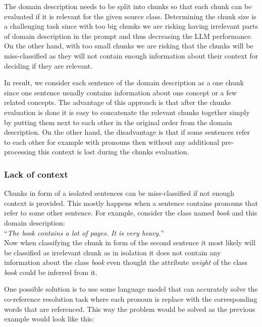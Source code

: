 The domain description needs to be split into chunks so that each chunk can be evaluated if it is relevant for the given source class. Determining the chunk size is a challenging task since with too big chunks we are risking having irrelevant parts of domain description in the prompt and thus decreasing the LLM performance. On the other hand, with too small chunks we are risking that the chunks will be miss-classified as they will not contain enough information about their context for deciding if they are relevant.

In result, we consider each sentence of the domain description as a one chunk since one sentence usually contains information about one concept or a few related concepts. The advantage of this approach is that after the chunks evaluation is done it is easy to concatenate the relevant chunks together simply by putting them next to each other in the original order from the domain description. On the other hand, the disadvantage is that if some sentences refer to each other for example with pronouns then without any additional pre-processing this context is lost during the chunks evaluation.


\subsubsection{Lack of context}

Chunks in form of a isolated sentences can be miss-classified if not enough context is provided. This mostly happens when a sentence contains pronouns that refer to some other sentence. For example, consider the class named \textit{book} and this domain description: \\

\noindent{}``\textit{The book contains a lot of pages. It is very heavy.}'' \\

\noindent{}Now when classifying the chunk in form of the second sentence it most likely will be classified as irrelevant chunk as in isolation it does not contain any information about the class \textit{book} even thought the attribute \textit{weight} of the class \textit{book} could be inferred from it.

One possible solution is to use some language model that can accurately solve the co-reference resolution task where each pronoun is replace with the corresponding words that are referenced. This way the problem would be solved as the previous example would look like this: \\

